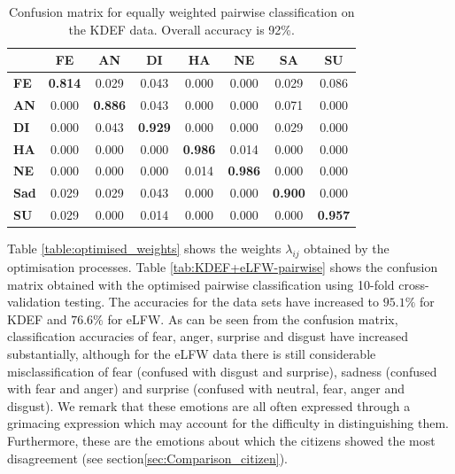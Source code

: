 \begin{table}[tb]
	\fontsize{12}{12}
	
	\centering
	\caption{Confusion matrix for equally weighted pairwise classification on the KDEF data.  
		Overall accuracy is 92\%.}
	\label{NewConfusion}
	\begin{tabular}{@{}|l|c|c|c|c|c|c|c|@{}}  \hline
		& \textbf{FE}     & \textbf{AN}    & \textbf{DI}    & \textbf{HA} & \textbf{NE} & \textbf{SA}    & \textbf{SU} \\ \hline
		\textbf{FE}          & \textbf{0.814} & 0.029          & 0.043            & 0.000          & 0.000            & 0.029          & 0.086             \\ \hline
		\textbf{AN}         & 0.000          & \textbf{0.886} & 0.043            & 0.000          & 0.000            & 0.071          & 0.000             \\ \hline
		\textbf{DI}       & 0.000          & 0.043          & \textbf{0.929}   & 0.000          & 0.000            & 0.029          & 0.000             \\ \hline
		\textbf{HA}         & 0.000          & 0.000          & 0.000            & \textbf{0.986} & 0.014            & 0.000          & 0.000             \\ \hline
		\textbf{NE}       & 0.000          & 0.000          & 0.000            & 0.014          & \textbf{0.986}   & 0.000          & 0.000             \\ \hline
		\textbf{Sad}           & 0.029          & 0.029          & 0.043            & 0.000          & 0.000            & \textbf{0.900} & 0.000             \\ \hline
		\textbf{SU}      & 0.029          & 0.000          & 0.014            & 0.000          & 0.000            & 0.000          & \textbf{0.957}    \\ \hline
	\end{tabular}
\end{table}
Table \ref{table:optimised_weights} shows the weights  $\lambda_{ij}$ obtained by the optimisation processes.
Table \ref{tab:KDEF+eLFW-pairwise} shows the confusion matrix obtained with the optimised pairwise classification using 10-fold cross-validation testing.  The accuracies for the data sets have increased to $95.1\%$ for KDEF and $76.6\%$ for eLFW. As can be seen from the confusion matrix, classification accuracies of fear, anger, surprise and disgust have increased substantially, although for the eLFW data there is still considerable misclassification of fear (confused with disgust and surprise), sadness (confused with fear and anger) and surprise (confused with neutral, fear, anger and disgust). We remark that these emotions are all often expressed through a grimacing expression which may account for the difficulty in distinguishing them. Furthermore, these are the emotions about which the citizens showed the most disagreement (see section\ref{sec:Comparison_citizen}). 





